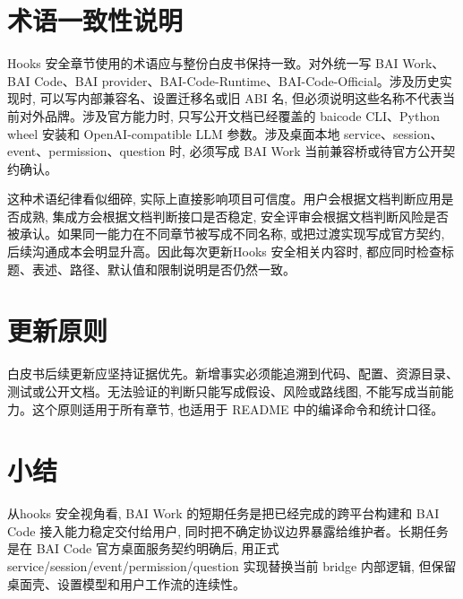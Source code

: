 \section{术语一致性说明}
Hooks 安全章节使用的术语应与整份白皮书保持一致。对外统一写 BAI Work、BAI Code、BAI provider、BAI-Code-Runtime、BAI-Code-Official。涉及历史实现时, 可以写内部兼容名、设置迁移名或旧 ABI 名, 但必须说明这些名称不代表当前对外品牌。涉及官方能力时, 只写公开文档已经覆盖的 baicode CLI、Python wheel 安装和 OpenAI-compatible LLM 参数。涉及桌面本地 service、session、event、permission、question 时, 必须写成 BAI Work 当前兼容桥或待官方公开契约确认。

这种术语纪律看似细碎, 实际上直接影响项目可信度。用户会根据文档判断应用是否成熟, 集成方会根据文档判断接口是否稳定, 安全评审会根据文档判断风险是否被承认。如果同一能力在不同章节被写成不同名称, 或把过渡实现写成官方契约, 后续沟通成本会明显升高。因此每次更新Hooks 安全相关内容时, 都应同时检查标题、表述、路径、默认值和限制说明是否仍然一致。

\section{更新原则}
白皮书后续更新应坚持证据优先。新增事实必须能追溯到代码、配置、资源目录、测试或公开文档。无法验证的判断只能写成假设、风险或路线图, 不能写成当前能力。这个原则适用于所有章节, 也适用于 README 中的编译命令和统计口径。

\section{小结}
从hooks 安全视角看, BAI Work 的短期任务是把已经完成的跨平台构建和 BAI Code 接入能力稳定交付给用户, 同时把不确定协议边界暴露给维护者。长期任务是在 BAI Code 官方桌面服务契约明确后, 用正式 service/session/event/permission/question 实现替换当前 bridge 内部逻辑, 但保留桌面壳、设置模型和用户工作流的连续性。
